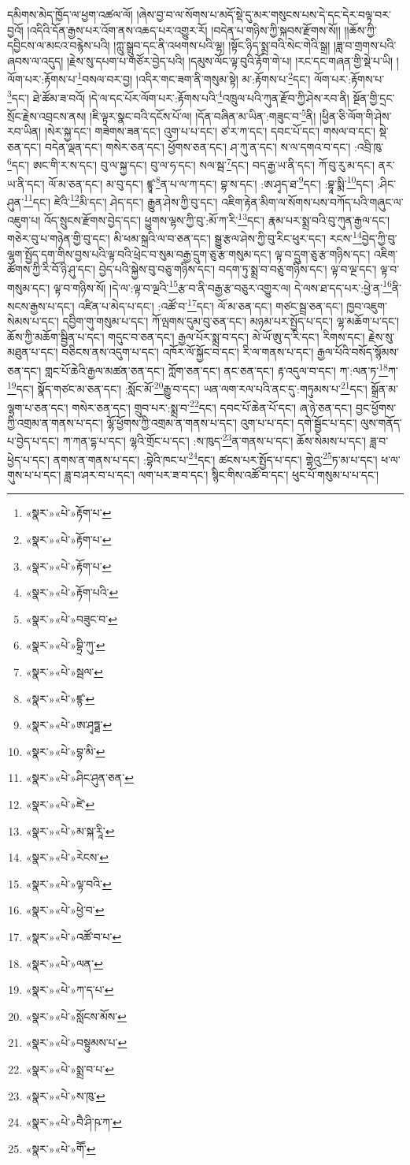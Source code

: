 དམིགས་མེད་ཁྱོད་ལ་ཕྱག་འཚལ་ལོ། །ཞེས་བྱ་བ་ལ་སོགས་པ་མདོ་སྡེ་དུ་མར་གསུངས་པས་དེ་དང་དེར་བལྟ་བར་བྱའོ། །འདིའི་དོན་རྒྱས་པར་འོག་ནས་འཆད་པར་འགྱུར་རོ། །བདེན་པ་གཉིས་ཀྱི་སྐབས་རྫོགས་སོ།། །།ཆོས་ཀྱི་དབྱིངས་ལ་མངའ་བརྙེས་པའི། །ཀླུ་སྒྲུབ་དང་ནི་འཕགས་པའི་ལྷ། །སྟོང་ཉིད་སྨྲ་བའི་སེང་གེའི་སྒྲ། །ཟླ་བ་གྲགས་པའི་ཞབས་ལ་འདུད། །རྗེས་སུ་དཔག་པ་གཙོར་བྱེད་པའི། །དམུས་ལོང་ལྟ་བུའི་རྟོག་གེ་པ། །རང་དང་གཞན་གྱི་སྡེ་པ་ཡི། །ལོག་པར་:རྟོགས་པ་\footnote{«སྣར་»«པེ་»རྟོག་པ་}བསལ་བར་བྱ། །འདིར་གང་ཟག་ནི་གསུམ་སྟེ། མ་:རྟོགས་པ་\footnote{«སྣར་»«པེ་»རྟོག་པ་}དང་། ལོག་པར་:རྟོགས་པ་\footnote{«སྣར་»«པེ་»རྟོག་པ་}དང་། ཐེ་ཚོམ་ཟ་བའོ། །དེ་ལ་དང་པོར་ལོག་པར་:རྟོགས་པའི་\footnote{«སྣར་»«པེ་»རྟོག་པའི་}འཁྲུལ་པའི་ཀུན་རྫོབ་ཀྱི་ཤེས་རབ་ནི། སྔོན་གྱི་དྲང་སྲོང་རྗེས་འབྲངས་ནས། །ཇི་ལྟར་སྣང་བའི་དངོས་པོ་ལ། །དོན་བཞིན་མ་ཡིན་:གཟུང་བ་\footnote{«སྣར་»«པེ་»བཟུང་བ་}ནི། །ཕྱིན་ཅི་ལོག་གི་ཤེས་རབ་ཡིན། །སེར་སྐྱ་དང་། གཟེགས་ཟན་དང་། འུག་པ་པ་དང་། ཙ་ར་ཀ་དང་། དབང་པོ་དང་། གསལ་བ་དང་། སྡེ་ཅན་དང་། བདེན་ལྡན་དང་། གསེར་ཅན་དང་། ཕྱོགས་ཅན་དང་། ཤ་ཀུ་ན་དང་། ས་ལ་དགའ་བ་དང་། :འབྲི་ཁུ་\footnote{«སྣར་»«པེ་»བྷྲི་ཀུ་}དང་། ཨང་གི་ར་ས་དང་། བུ་ལ་སྐྱ་དང་། བུ་ལ་ཧ་དང་། སལ་སྦ་\footnote{«སྣར་»«པེ་»སྦལ་}དང་། བད་རྒྱ་ཡ་ནི་དང་། ཀོ་བུ་རུ་མ་དང་། ནར་ཡ་ནི་དང་། ལོ་མ་ཅན་དང་། མ་བུ་དང་། ཛྙཱ་\footnote{«སྣར་»«པེ་»ཛྙ་}ན་པ་ལ་ཀ་དང་། བྷ་ས་དང་། :ཨ་ཤྭད་ཐ་\footnote{«སྣར་»«པེ་»ཨ་ཤྭཏྠ་}དང་། :བྷཱ་སྨི་\footnote{«སྣར་»«པེ་»བྷ་མི་}དང་། :ཤིང་ཤུན་\footnote{«སྣར་»«པེ་»ཤིང་ཤུན་ཅན་}དང་། ཛེའི་\footnote{«སྣར་»«པེ་»ཛེ་}མི་དང་། ཤེད་དང་། རྒྱུན་ཤེས་ཀྱི་བུ་དང་། འཇིག་རྟེན་མིག་ལ་སོགས་པས་བཀོད་པའི་གཞུང་ལ་འཇུག་པ། འོད་སྲུངས་རྫོགས་བྱེད་དང་། ཕྱུགས་ལྷས་ཀྱི་བུ་:མོ་ཀ་རི་\footnote{«སྣར་»«པེ་»མ་སྐ་རཱི་}དང་། རྣམ་པར་སྨྲ་བའི་བུ་ཀུན་རྒྱལ་དང་། གཅེར་བུ་པ་གཉེན་གྱི་བུ་དང་། མི་ཕམ་སྐྲའི་ལ་བ་ཅན་དང་། སྒྱུ་རྩལ་ཤེས་ཀྱི་བུ་རིང་ཕུར་དང་། རངས་\footnote{«སྣར་»«པེ་»རེངས་}བྱེད་ཀྱི་བུ་ལྷག་སྤྱོད་དག་གིས་བྱས་པའི་ལྟ་བའི་ཕྲེང་བ་སུམ་བརྒྱ་དྲུག་ཅུ་རྩ་གསུམ་དང་། ལྟ་བ་དྲུག་ཅུ་རྩ་གཉིས་དང་། འཇིག་ཚོགས་ཀྱི་རི་བོ་ཉི་ཤུ་དང་། བྱེད་པའི་སྐྱེས་བུ་བཅུ་གཉིས་དང་། བདག་ཏུ་སྨྲ་བ་བཅུ་གཉིས་དང་། ལྟ་བ་ལྔ་དང་། ལྟ་བ་གསུམ་དང་། ལྟ་བ་གཉིས་སོ། །དེ་ལ་:ལྟ་བ་ལྔའི་\footnote{«སྣར་»«པེ་»ལྟ་བའི་}རྩ་བ་ནི་བརྒྱ་རྩ་བཅུར་འགྱུར་ལ། དེ་ལས་ཐ་དད་པར་:ཕྱེ་ན་\footnote{«སྣར་»«པེ་»ཕྱེ་བ་}ནི་སངས་རྒྱས་པ་དང་། འཛིན་པ་མེད་པ་དང་། :འཚོ་བ་\footnote{«སྣར་»«པེ་»འཚོ་བ་པ་}དང་། ལོ་མ་ཅན་དང་། གཙང་སྦྲ་ཅན་དང་། ཁྱབ་འཇུག་སེམས་པ་དང་། དབྱིག་གུ་གསུམ་པ་དང་། ཀོ་ལྤགས་དུམ་བུ་ཅན་དང་། མཉམ་པར་སྤྱོད་པ་དང་། ལྷ་མཆོག་པ་དང་། ཆོས་ཀྱི་མཆོག་སྦྱིན་པ་དང་། གདུང་བ་ཅན་དང་། རྒྱལ་པོར་སྨྲ་བ་དང་། མེ་ཡོ་ཨུ་ད་རི་དང་། རིགས་དང་། རྗེས་སུ་མཐུན་པ་དང་། བཅིངས་ནས་འདུག་པ་དང་། འཁོར་ལོ་སྐྱོང་བ་དང་། རི་ལ་གནས་པ་དང་། རྒྱལ་པོའི་བསོད་སྙོམས་ཅན་དང་། གླང་པོ་ཆེའི་རྒྱལ་མཚན་ཅན་དང་། ཀློག་ཅན་དང་། ནང་ཅན་དང་། རྟ་འདུལ་བ་དང་། ཀ་:ལན་ཏ་\footnote{«སྣར་»«པེ་»ལན་}ཀ་\footnote{«སྣར་»«པེ་»ཀ་ད་པ་}དང་། སྣོད་གཙང་མ་ཅན་དང་། :སློང་མོ་\footnote{«སྣར་»«པེ་»སློངས་མོས་}རྒྱུ་བ་དང་། ཡན་ལག་རལ་པའི་ནང་དུ་:གཏུམས་པ་\footnote{«སྣར་»«པེ་»བསྟུམས་པ་}དང་། སྒྲོན་མ་ལྷག་པ་ཅན་དང་། གསེར་ཅན་དང་། གྲུབ་པར་:སྨྲ་བ་\footnote{«སྣར་»«པེ་»སྨྲ་བ་པ་}དང་། དབང་པོ་ཆེན་པོ་དང་། ཞ་ཉེ་ཅན་དང་། བྱང་ཕྱོགས་ཀྱི་འགྲམ་ན་གནས་པ་དང་། ལྷོ་ཕྱོགས་ཀྱི་འགྲམ་ན་གནས་པ་དང་། འུག་པ་པ་དང་། དགེ་སྦྱོང་པ་དང་། ལུས་གནོད་པ་བྱེད་པ་དང་། ཀ་ཀན་དྷ་པ་དང་། ལྷའི་གྲོང་པ་དང་། :ས་ཁུད་\footnote{«སྣར་»«པེ་»ས་ཁུ་}ན་གནས་པ་དང་། ཆོས་སེམས་པ་དང་། ཟླ་བ་ཕྱེད་པ་དང་། ནགས་ན་གནས་པ་དང་། :བྷེའི་ཁང་པ་\footnote{«སྣར་»«པེ་»བཻ་ཤི་ཥ་ཀ་}དང་། ཚངས་པར་སྤྱོད་པ་དང་། གྷེའུ་\footnote{«སྣར་»«པེ་»གཽ་}ཏ་མ་པ་དང་། ཕ་ལ་གུས་པ་པ་དང་། ཟླ་བ་ཤར་བ་པ་དང་། ལག་པར་ཟ་བ་དང་། སྙིང་གིས་འཚོ་བ་དང་། ཕུང་པོ་གསུམ་པ་པ་དང་། 